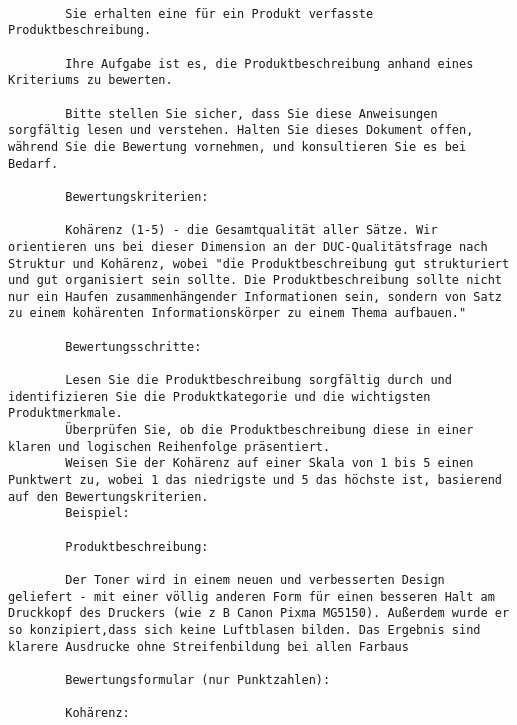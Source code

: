 {\tiny 
	\begin{lstlisting}[breaklines=true, caption={a sample Coherence Metric prompt for \ref{exmaple-postprocessed}. The template for this prompt came from \cite{liu2023geval} and was then edited to fit our case}, captionpos=b]
		
		Sie erhalten eine für ein Produkt verfasste Produktbeschreibung.
		
		Ihre Aufgabe ist es, die Produktbeschreibung anhand eines Kriteriums zu bewerten.
		
		Bitte stellen Sie sicher, dass Sie diese Anweisungen sorgfältig lesen und verstehen. Halten Sie dieses Dokument offen, während Sie die Bewertung vornehmen, und konsultieren Sie es bei Bedarf.
		
		Bewertungskriterien:
		
		Kohärenz (1-5) - die Gesamtqualität aller Sätze. Wir orientieren uns bei dieser Dimension an der DUC-Qualitätsfrage nach Struktur und Kohärenz, wobei "die Produktbeschreibung gut strukturiert und gut organisiert sein sollte. Die Produktbeschreibung sollte nicht nur ein Haufen zusammenhängender Informationen sein, sondern von Satz zu einem kohärenten Informationskörper zu einem Thema aufbauen."
		
		Bewertungsschritte:
		
		Lesen Sie die Produktbeschreibung sorgfältig durch und identifizieren Sie die Produktkategorie und die wichtigsten Produktmerkmale.
		Überprüfen Sie, ob die Produktbeschreibung diese in einer klaren und logischen Reihenfolge präsentiert.
		Weisen Sie der Kohärenz auf einer Skala von 1 bis 5 einen Punktwert zu, wobei 1 das niedrigste und 5 das höchste ist, basierend auf den Bewertungskriterien.
		Beispiel:
		
		Produktbeschreibung:
		
		Der Toner wird in einem neuen und verbesserten Design geliefert - mit einer völlig anderen Form für einen besseren Halt am Druckkopf des Druckers (wie z B Canon Pixma MG5150). Außerdem wurde er so konzipiert,dass sich keine Luftblasen bilden. Das Ergebnis sind klarere Ausdrucke ohne Streifenbildung bei allen Farbaus
		
		Bewertungsformular (nur Punktzahlen):
		
		Kohärenz:
		
	\end{lstlisting}
}